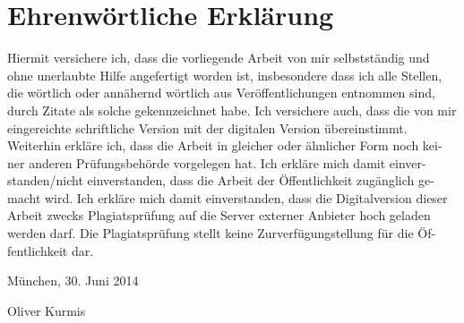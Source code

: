 \chapter{Ehrenwörtliche Erklärung}  
 
Hiermit  versichere  ich,  dass  die  vorliegende  Arbeit  von  mir  selbstständig  und 
ohne unerlaubte Hilfe angefertigt worden ist, insbesondere dass ich alle Stellen, 
die wörtlich oder annähernd wörtlich aus Veröffentlichungen entnommen sind, 
durch Zitate als solche gekennzeichnet habe. Ich versichere auch, dass die von 
mir  eingereichte  schriftliche  Version  mit  der  digitalen  Version  übereinstimmt. 
Weiterhin erkläre ich, dass die Arbeit in gleicher oder ähnlicher Form noch kei-
ner  anderen  Prüfungsbehörde  vorgelegen  hat.  Ich  erkläre  mich  damit  einver-
standen/nicht  einverstanden,  dass  die  Arbeit  der  Öffentlichkeit  zugänglich  ge-
macht wird. Ich erkläre mich damit einverstanden, dass die Digitalversion dieser 
Arbeit zwecks Plagiatsprüfung auf die Server externer Anbieter hoch geladen 
werden  darf.  Die  Plagiatsprüfung  stellt  keine  Zurverfügungstellung  für  die  Öf-
fentlichkeit dar.
 
München, 30. Juni 2014

Oliver Kurmis  